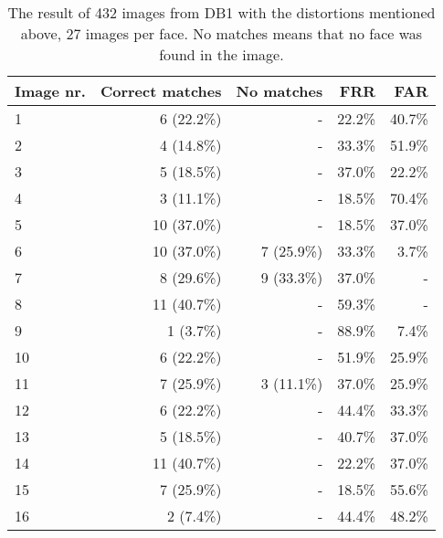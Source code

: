 \begin{table}
    \caption{The result of 432 images from DB1 with the distortions mentioned above, 27 images per face. No matches means that no face was found in the image.}
    \begin{tabular}{|l|r|r|r|r|}
    \hline
    \textbf{Image nr.}   & \textbf{Correct matches}   & \textbf{No matches}       & \textbf{FRR}    & \textbf{FAR}       \\ \hline
    1           & 6 (22.2\%)        & -                & 22.2\% & 40.7\%    \\ \hline
    2           & 4 (14.8\%)        & -                & 33.3\% & 51.9\%    \\ \hline
    3           & 5 (18.5\%)        & -                & 37.0\% & 22.2\%    \\ \hline
    4           & 3 (11.1\%)        & -                & 18.5\% & 70.4\%    \\ \hline
    5           & 10 (37.0\%)       & -                & 18.5\% & 37.0\%    \\ \hline
    6           & 10 (37.0\%)       & 7 (25.9\%)       & 33.3\% & 3.7\%     \\ \hline
    7           & 8 (29.6\%)        & 9 (33.3\%)       & 37.0\% & -         \\ \hline
    8           & 11 (40.7\%)       & -                & 59.3\% & -         \\ \hline
    9           & 1 (3.7\%)         & -                & 88.9\% & 7.4\%     \\ \hline
    10          & 6 (22.2\%)        & -                & 51.9\% & 25.9\%    \\ \hline
    11          & 7 (25.9\%)        & 3 (11.1\%)       & 37.0\% & 25.9\%    \\ \hline
    12          & 6 (22.2\%)        & -                & 44.4\% & 33.3\%    \\ \hline
    13          & 5 (18.5\%)        & -                & 40.7\% & 37.0\%    \\ \hline
    14          & 11 (40.7\%)       & -                & 22.2\% & 37.0\%    \\ \hline
    15          & 7 (25.9\%)        & -                & 18.5\% & 55.6\%    \\ \hline
    16          & 2 (7.4\%)         & -                & 44.4\% & 48.2\%    \\
    \hline
    \end{tabular}
    \label{tbl:breakdown}
\end{table}


